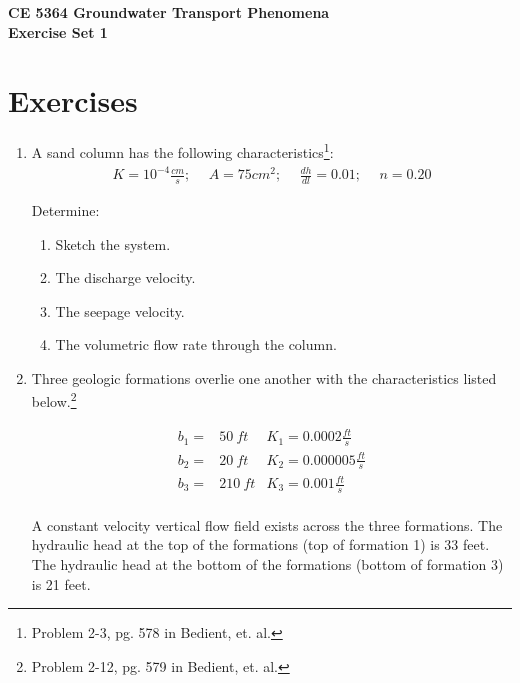 \documentclass[12pt]{article}
\begin{document}
\begin{center}
{\textbf{{ CE 5364 Groundwater Transport Phenomena } \\ {Exercise Set 1}}}
\end{center}

\section*{\small{Exercises}}
\begin{enumerate}
\item 

A sand column has the following characteristics\footnote{Problem 2-3, pg. 578 in Bedient, et. al.}:
\begin{equation}
  \begin{aligned}
    K = 10^{-4} \frac{cm}{s}; & ~~A = 75 cm^{2}; & ~~\frac{dh}{dl} = 0.01; & ~~n = 0.20 
  \end{aligned}
\end{equation}

Determine:
\begin{enumerate}
\item Sketch the system.
\item The discharge velocity.
\item The seepage velocity.
\item The volumetric flow rate through the column.
\end{enumerate}

\item Three geologic formations overlie one another with the characteristics listed below.\footnote{Problem 2-12, pg. 579 in Bedient, et. al.}

\begin{equation}
  \begin{aligned}
b_1 = & 50~ft &K_1 =   0.0002 \frac{ft}{s} \\ 
b_2 = & 20~ft &K_2 = 0.000005 \frac{ft}{s} \\
b_3 = &210~ft &K_3 =    0.001 \frac{ft}{s} \\
  \end{aligned}
\end{equation}

A constant velocity vertical flow field exists across the three formations.
The hydraulic head at the top of the formations (top of formation 1) is 33 feet.  The hydraulic head at the bottom of the formations (bottom of formation 3) is 21 feet.


\end{enumerate}
\end{document}

